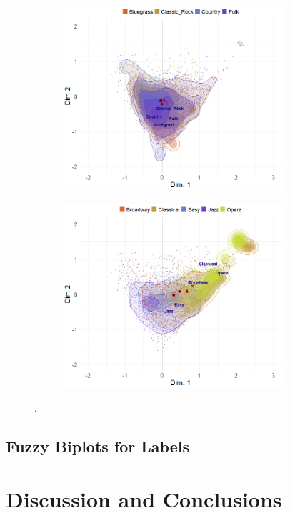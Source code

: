 \documentclass[12pt]{article}
\begin{document}
\begin{figure}[t]
\begin{subfigure}[b]{0.49\textwidth}
        \includegraphics[trim={0cm 0cm 0cm 0cm},clip, width=0.9\textwidth]{Plots/genre-proto-ex5.png}
            \caption{}
            \label{fig:}
    \end{subfigure}
     \begin{subfigure}[b]{0.49\textwidth}
        \includegraphics[trim={0cm 0cm 0cm 0cm},clip, width=0.9\textwidth]{Plots/genre-proto-ex7.png}
            \caption{}
            \label{fig:}
    \end{subfigure}
    \caption{.}
    \label{fig:}
\end{figure}


\subsection*{Fuzzy Biplots for Labels}

\section*{Discussion and Conclusions}

\newpage


\end{document}
